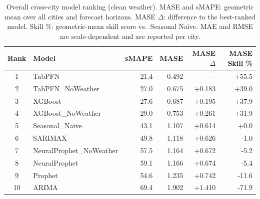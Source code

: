 \begin{table}[ht!]
\centering
\caption{Overall cross-city model ranking (clean weather). MASE and sMAPE: geometric mean over all cities and forecast horizons. MASE \(\Delta\): difference to the best-ranked model. Skill \%: geometric-mean skill score vs.\ Seasonal Naive. MAE and RMSE are scale-dependent and are reported per city.}
\label{tab:cross_city_overall_ranking}
{\small\setlength{\tabcolsep}{4pt}\scriptsize
\begin{tabular}{clrrrr}
\toprule
Rank & Model & sMAPE & MASE & MASE \(\Delta\) & MASE Skill \% \\
\midrule
1 & TabPFN & 21.4 & 0.492 & --- & +55.5 \\
2 & TabPFN\_NoWeather & 27.0 & 0.675 & +0.183 & +39.0 \\
3 & XGBoost & 27.6 & 0.687 & +0.195 & +37.9 \\
4 & XGBoost\_NoWeather & 29.0 & 0.753 & +0.261 & +31.9 \\
5 & Seasonal\_Naive & 43.1 & 1.107 & +0.614 & +0.0 \\
6 & SARIMAX & 49.8 & 1.118 & +0.626 & -1.0 \\
7 & NeuralProphet\_NoWeather & 57.5 & 1.164 & +0.672 & -5.2 \\
8 & NeuralProphet & 59.1 & 1.166 & +0.674 & -5.4 \\
9 & Prophet & 54.6 & 1.235 & +0.742 & -11.6 \\
10 & ARIMA & 69.4 & 1.902 & +1.410 & -71.9 \\
\bottomrule
\end{tabular}
}
\end{table}
